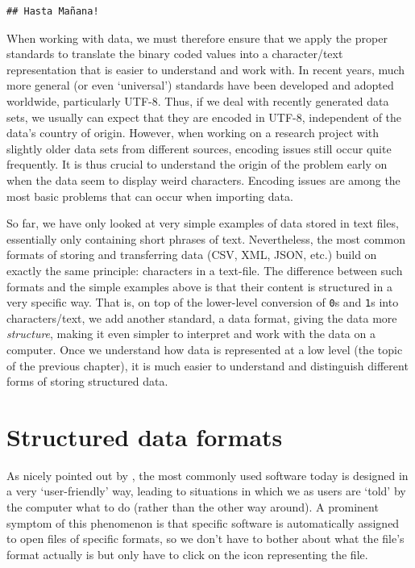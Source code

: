 \documentclass[
  12pt,
]{style/krantz}
\begin{document}
\begin{verbatim}
## Hasta Mañana!
\end{verbatim}

When working with data, we must therefore ensure that we apply the proper standards to translate the binary coded values into a character/text representation that is easier to understand and work with. In recent years, much more general (or even `universal') standards have been developed and adopted worldwide, particularly UTF-8. Thus, if we deal with recently generated data sets, we usually can expect that they are encoded in UTF-8, independent of the data's country of origin. However, when working on a research project with slightly older data sets from different sources, encoding issues still occur quite frequently. It is thus crucial to understand the origin of the problem early on when the data seem to display weird characters. Encoding issues are among the most basic problems that can occur when importing data.

So far, we have only looked at very simple examples of data stored in text files, essentially only containing short phrases of text. Nevertheless, the most common formats of storing and transferring data (CSV, XML, JSON, etc.) build on exactly the same principle: characters in a text-file. The difference between such formats and the simple examples above is that their content is structured in a very specific way. That is, on top of the lower-level conversion of \texttt{0}s and \texttt{1}s into characters/text, we add another standard, a data format, giving the data more \emph{structure}, making it even simpler to interpret and work with the data on a computer. Once we understand how data is represented at a low level (the topic of the previous chapter), it is much easier to understand and distinguish different forms of storing structured data.

\hypertarget{structured-data-formats}{%
\section{Structured data formats}\label{structured-data-formats}}

As nicely pointed out by \citet{murrell_2009}, the most commonly used software today is designed in a very `user-friendly' way, leading to situations in which we as users are `told' by the computer what to do (rather than the other way around). A prominent symptom of this phenomenon is that specific software is automatically assigned to open files of specific formats, so we don't have to bother about what the file's format actually is but only have to click on the icon representing the file.
\end{document}
